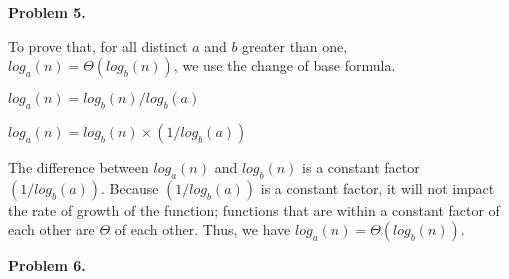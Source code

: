 \documentclass{article}
\begin{document}
\textbf{Problem 5.}

	To prove that, for all distinct $a$ and $b$ greater than one, $log_{a} (n) = \Theta(log_{b} (n))$, we use the change of base formula.
	
	$log_{a} (n) = log_{b} (n) / log_{b} (a)$
	
	$log_{a} (n) = log_{b} (n) \times (1 / log_{b} (a))$
	
	The difference between $log_{a} (n)$ and $log_{b} (n)$ is a constant factor $(1 / log_{b} (a))$.  Because $(1 / log_{b} (a))$ is a constant factor, it will not impact the rate of growth of the function; functions that are within a constant factor of each other are $\Theta$ of each other.  Thus, we have $log_{a} (n) = \Theta(log_{b} (n))$.
	
\newpage

\textbf{Problem 6.}
\end{document}

